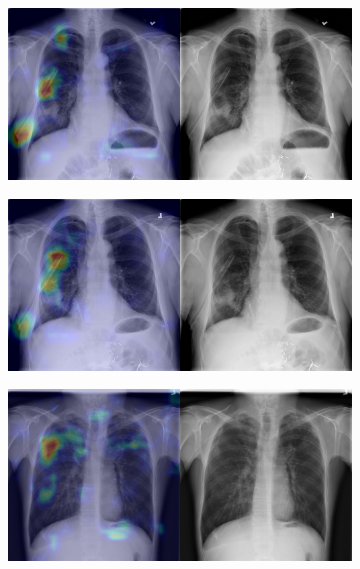\begin{figure}[b]
\begin{subfigure}{0.4\textwidth}
    \end{subfigure}
    \begin{subfigure}{0.4\textwidth}
        \centering
        \includegraphics[width=1.0\textwidth]{Chapters/5. Conclusiones/img/Pneumothorax/1_1_00000744_009.png}
    \end{subfigure}
    \begin{subfigure}{0.4\textwidth}
        \centering
        \includegraphics[width=1.0\textwidth]{Chapters/5. Conclusiones/img/Pneumothorax/1_1_00000744_010.png}
    \end{subfigure}
    \begin{subfigure}{0.4\textwidth}
        \centering
        \includegraphics[width=1.0\textwidth]{Chapters/5. Conclusiones/img/Pneumothorax/1_1_00001006_000.png}

\end{subfigure}
\end{figure}
